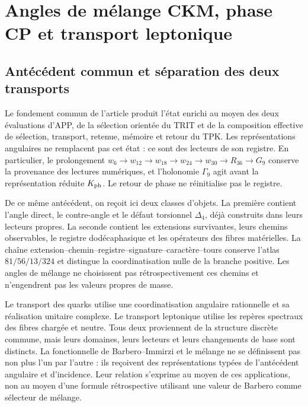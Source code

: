 
\section{Angles de mélange CKM, phase CP et transport leptonique}
\label{sec:ii-propagacion-angular}

\subsection{Antécédent commun et séparation des deux transports}

Le fondement commun de l’article produit l’état enrichi au moyen
des deux évaluations d’APP, de la sélection orientée du TRIT et de la
composition effective de sélection, transport, retenue, mémoire et retour
du TPK. Les représentations angulaires ne remplacent pas cet état : ce sont des lecteurs
de son registre. En particulier, le prolongement
\(w_6\to w_{12}\to w_{18}\to w_{24}\to w_{30}\to R_{36}\to G_9\)
conserve la provenance des lectures numériques, et l’holonomie
\(\Gamma_9\) agit avant la représentation réduite \(K_{\rm ph}\).
Le retour de phase ne réinitialise pas le registre.

De ce même antécédent, on reçoit ici deux classes d’objets. La première
contient l’angle direct, le contre-angle et le défaut torsionnel
\(\Delta_4\), déjà construits dans leurs lecteurs propres. La seconde contient
les extensions survivantes, leurs chemins observables, le registre
dodécaphasique et les opérateurs des fibres matérielles. La chaîne
extension--chemin--registre--signature--caractère--tours conserve l’atlas
\(81/56/13/324\) et distingue la coordinatisation nulle de la branche positive.
Les angles de mélange ne choisissent pas rétrospectivement ces chemins et n’engendrent pas
les valeurs propres de masse.

Le transport des quarks utilise une coordinatisation angulaire rationnelle et sa réalisation
unitaire complexe. Le transport leptonique utilise les repères spectraux
des fibres chargée et neutre. Tous deux proviennent de la structure discrète
commune, mais leurs domaines, leurs lecteurs et leurs changements de base sont distincts.
La fonctionnelle de Barbero--Immirzi et le mélange ne se définissent pas non plus l’un par
l’autre : ils reçoivent des représentations typées de l’antécédent angulaire et d’incidence.
Leur relation s’exprime au moyen de ces applications, non au moyen d’une
formule rétrospective utilisant une valeur de Barbero comme sélecteur de mélange.

